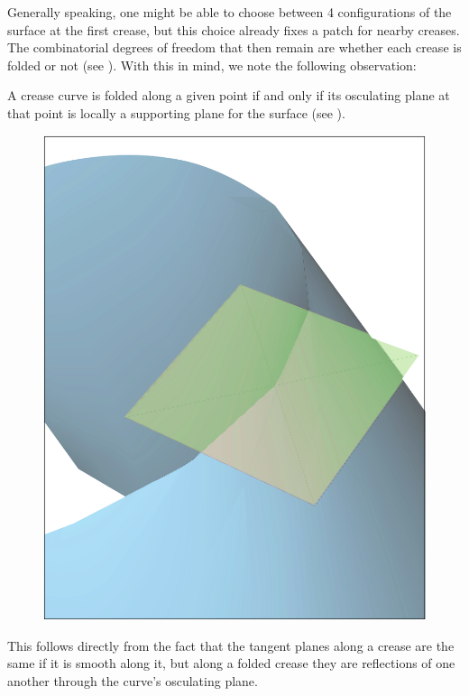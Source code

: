 Generally speaking, one might be able to choose between 4 configurations of the surface at the first crease, but this choice already fixes a patch for nearby creases. The combinatorial degrees of freedom that then remain are whether each crease is folded or not (see  ). With this in mind, we note the following observation:

\begin{theorem}\label{Thm:supporting_plane}
A crease curve is folded along a given point if and only if its osculating plane at that point is locally a supporting plane for the surface (see ).
\end{theorem}

\begin{figure} [h]
	\centering
	\includegraphics[width=0.5\linewidth]{figures/plane_side}
	\caption{}
	\label{fig:plane_side}
\end{figure}

This follows directly from the fact that the tangent planes along a crease are the same if it is smooth along it, but along a folded crease they are reflections of one another through the curve's osculating plane. %



